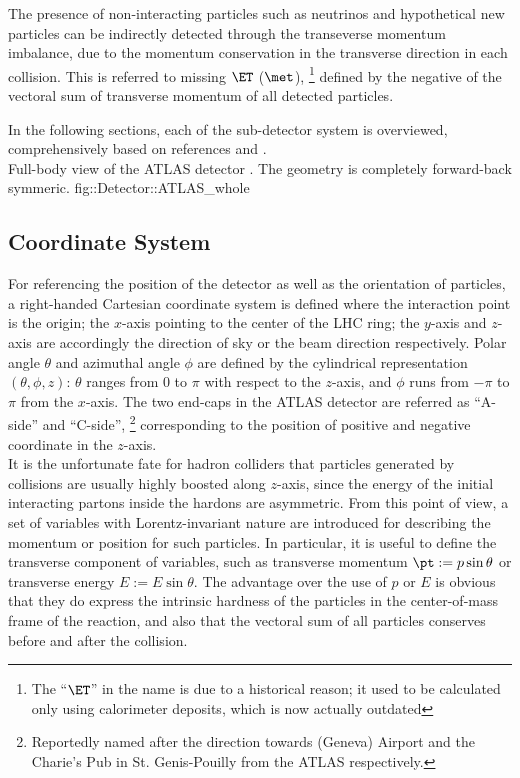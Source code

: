 The presence of non-interacting particles such as neutrinos and hypothetical new particles can be indirectly detected through the transeverse momentum imbalance, due to the momentum conservation in the transverse direction in each collision.
This is referred to missing $\ET$ ($\met$), 
\footnote{The ``$\ET$'' in the name is due to a historical reason; it used to be calculated only using calorimeter deposits, which is now actually outdated
}
defined by the negative of the vectoral sum of transverse momentum of all detected particles.


In the following sections, each of the sub-detector system is overviewed, comprehensively based on references \cite{ATLAS_exp} and \cite{ATLAS_TDR}. \\

{Full-body view of the ATLAS detector \cite{ATLAScosmicPerf}. The geometry is completely forward-back symmeric.}
{fig::Detector::ATLAS_whole}


\subsection{Coordinate System}
For referencing the position of the detector as well as the orientation of particles, a right-handed Cartesian coordinate system is defined where the interaction point is the origin; the $x$-axis pointing to the center of the LHC ring; the $y$-axis and $z$-axis are accordingly the direction of sky or the beam direction respectively. Polar angle $\theta$ and azimuthal angle $\phi$ are defined by the cylindrical representation $(\theta,\phi,z)$: $\theta$ ranges from 0 to $\pi$ with respect to the $z$-axis, and $\phi$ runs from $-\pi$ to $\pi$ from the $x$-axis. The two end-caps in the ATLAS detector are referred as ``A-side'' and ``C-side'', 
\footnote{Reportedly named after the direction towards (Geneva) Airport and the Charie's Pub in St. Genis-Pouilly from the ATLAS respectively.}
corresponding to the position of positive and negative coordinate in the $z$-axis. \\

It is the unfortunate fate for hadron colliders that particles generated by collisions are usually highly boosted along $z$-axis, 
since the energy of the initial interacting partons inside the hardons are asymmetric. 
From this point of view, a set of variables with Lorentz-invariant nature are introduced for describing the momentum or position for such particles. 
In particular, it is useful to define the transverse component of variables, such as transverse momentum $\pt := p\sin{\theta}$ or transverse energy $E := E\sin{\theta}$. 
The advantage over the use of $p$ or $E$ is obvious that they do express the intrinsic hardness of the particles in the center-of-mass frame of the reaction, 
and also that the vectoral sum of all particles conserves before and after the collision. \\

